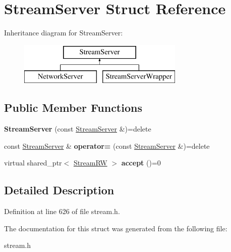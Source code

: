 \hypertarget{structStreamServer}{\section{Stream\+Server Struct Reference}
\label{structStreamServer}
}
Inheritance diagram for Stream\+Server\+:\begin{figure}[H]
\begin{center}
\leavevmode
\includegraphics[height=2.000000cm]{structStreamServer}
\end{center}
\end{figure}
\subsection*{Public Member Functions}
\begin{DoxyCompactItemize}
\item 
\hypertarget{structStreamServer_a98ac1ebdefdda7de91316a257929d8aa}{{\bfseries Stream\+Server} (const \hyperlink{structStreamServer}{Stream\+Server} \&)=delete}\label{structStreamServer_a98ac1ebdefdda7de91316a257929d8aa}

\item 
\hypertarget{structStreamServer_a98ef01fed37a9cc9385c4913c3af0aef}{const \hyperlink{structStreamServer}{Stream\+Server} \& {\bfseries operator=} (const \hyperlink{structStreamServer}{Stream\+Server} \&)=delete}\label{structStreamServer_a98ef01fed37a9cc9385c4913c3af0aef}

\item 
\hypertarget{structStreamServer_a06a1058be6f7b74a0a26367f00968d81}{virtual shared\+\_\+ptr$<$ \hyperlink{structStreamRW}{Stream\+R\+W} $>$ {\bfseries accept} ()=0}\label{structStreamServer_a06a1058be6f7b74a0a26367f00968d81}

\end{DoxyCompactItemize}


\subsection{Detailed Description}


Definition at line 626 of file stream.\+h.



The documentation for this struct was generated from the following file\+:\begin{DoxyCompactItemize}
\item 
stream.\+h\end{DoxyCompactItemize}
